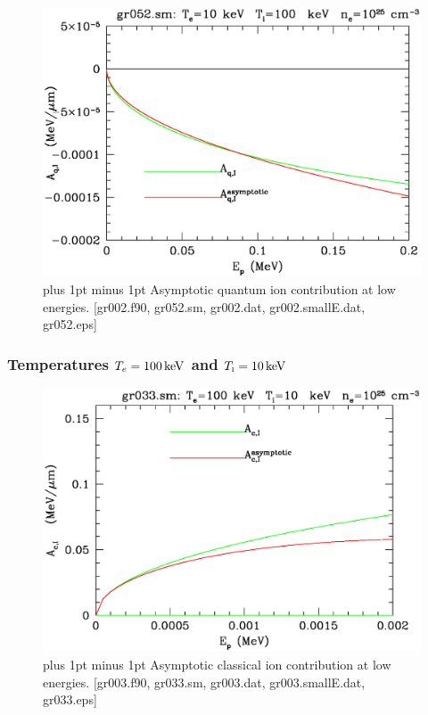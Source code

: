 \documentclass[preprint,12pt,eqsecnum,nofootinbib,amsmath,amssymb]{revtex4}
\newcommand{\smI}{{\rm\scriptscriptstyle I}}
\newcommand{\footnoteskip}{\baselineskip 12pt plus 1pt minus 1pt}
\begin{document}
\vskip-2cm 
\begin{figure}[h!]
\includegraphics[scale=0.45]{gr052.eps} 
\vskip-0.8cm 
\caption{\footnoteskip  
  Asymptotic quantum ion contribution at low energies. [gr002.f90,
  gr052.sm, gr002.dat, gr002.smallE.dat, gr052.eps] 
}
\label{fig:gr052}
\end{figure}


\pagebreak
\subsubsection{Temperatures $T_e=100\,{\rm keV}$ and $T_\smI=10\,{\rm keV}$}

\vskip-2cm 
\begin{figure}[h!]
\includegraphics[scale=0.45]{gr033.eps} 
\vskip-0.8cm 
\caption{\footnoteskip  
  Asymptotic classical ion contribution at low energies. [gr003.f90,
  gr033.sm, gr003.dat, gr003.smallE.dat, gr033.eps] 
}
\label{fig:gr033}
\end{figure}
\end{document}
